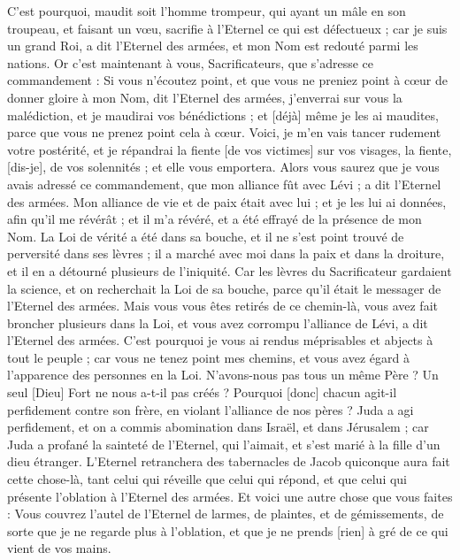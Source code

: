 \begin{multicols}{2}
C'est pourquoi, maudit soit l'homme trompeur, qui ayant un mâle en son troupeau, et faisant un vœu, sacrifie à l'Eternel ce qui est défectueux ; car je suis un grand Roi, a dit l'Eternel des armées, et mon Nom est redouté parmi les nations.
\VerseOne{}Or c'est maintenant à vous, Sacrificateurs, que s'adresse ce commandement :
Si vous n'écoutez point, et que vous ne preniez point à cœur de donner gloire à mon Nom, dit l'Eternel des armées, j'enverrai sur vous la malédiction, et je maudirai vos bénédictions ; et [déjà] même je les ai maudites, parce que vous ne prenez point cela à cœur.
Voici, je m'en vais tancer rudement votre postérité, et je répandrai la fiente [de vos victimes] sur vos visages, la fiente, [dis-je], de vos solennités ; et elle vous emportera.
Alors vous saurez que je vous avais adressé ce commandement, que mon alliance fût avec Lévi ; a dit l'Eternel des armées.
Mon alliance de vie et de paix était avec lui ; et je les lui ai données, afin qu'il me révérât ; et il m'a révéré, et a été effrayé de la présence de mon Nom.
La Loi de vérité a été dans sa bouche, et il ne s'est point trouvé de perversité dans ses lèvres ; il a marché avec moi dans la paix et dans la droiture, et il en a détourné plusieurs de l'iniquité.
Car les lèvres du Sacrificateur gardaient la science, et on recherchait la Loi de sa bouche, parce qu'il était le messager de l'Eternel des armées.
Mais vous vous êtes retirés de ce chemin-là, vous avez fait broncher plusieurs dans la Loi, et vous avez corrompu l'alliance de Lévi, a dit l'Eternel des armées.
C'est pourquoi je vous ai rendus méprisables et abjects à tout le peuple ; car vous ne tenez point mes chemins, et vous avez égard à l'apparence des personnes en la Loi.
N'avons-nous pas tous un même Père ? Un seul [Dieu] Fort ne nous a-t-il pas créés ? Pourquoi [donc] chacun agit-il perfidement contre son frère, en violant l'alliance de nos pères ?
Juda a agi perfidement, et on a commis abomination dans Israël, et dans Jérusalem ; car Juda a profané la sainteté de l'Eternel, qui l'aimait, et s'est marié à la fille d'un dieu étranger.
L'Eternel retranchera des tabernacles de Jacob quiconque aura fait cette chose-là, tant celui qui réveille que celui qui répond, et que celui qui présente l’oblation à l'Eternel des armées.
Et voici une autre chose que vous faites : Vous couvrez l'autel de l'Eternel de larmes, de plaintes, et de gémissements, de sorte que je ne regarde plus à l'oblation, et que je ne prends [rien] à gré de ce qui vient de vos mains.

\end{multicols}
